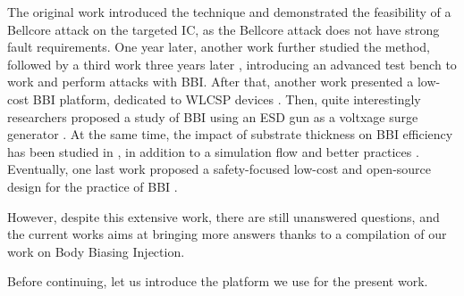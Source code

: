 		The original work \cite{bbiOrigin} introduced the technique and demonstrated the feasibility of a Bellcore attack on the targeted IC, as the Bellcore attack does not have strong fault requirements.
		One year later, another work \cite{bbiSecond} further studied the method, followed by a third work three years later \cite{bbiThird}, introducing an advanced test bench to work and perform attacks with BBI.
		After that, another work presented a low-cost BBI platform, dedicated to WLCSP devices \cite{bbiColin}.
		Then, quite interestingly researchers proposed a study of BBI using an ESD gun as a voltxage surge generator \cite{japbbi, japbbi2}.
		At the same time, the impact of substrate thickness on BBI efficiency has been studied in \cite{mybbiCosade}, in addition to a simulation flow and better practices \cite{mybbiFdtc2022,mybbifdtc2023}.
		Eventually, one last work proposed a safety-focused low-cost and open-source design for the practice of BBI \cite{colinFdtc2023}.

		However, despite this extensive work, there are still unanswered questions, and the current works aims at bringing more answers thanks to a compilation of our work on Body Biasing Injection.

		Before continuing, let us introduce the platform we use for the present work.

%
%		
%

